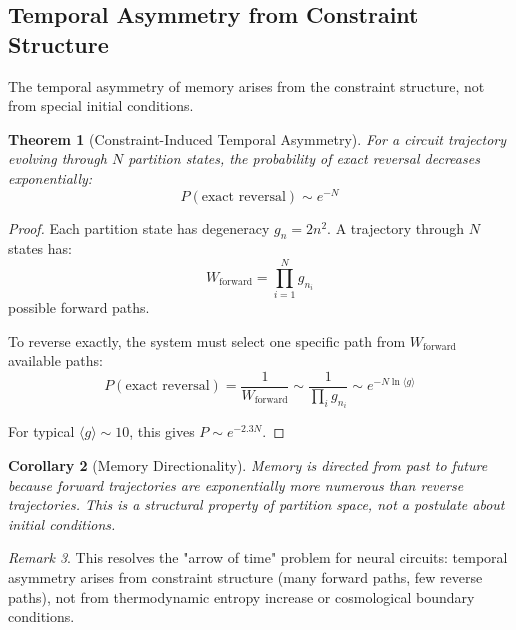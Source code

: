 \documentclass[aps,prd,twocolumn,superscriptaddress,floatfix,nofootinbib]{revtex4-2}
\newtheorem{theorem}{Theorem}[section]
\newtheorem{corollary}[theorem]{Corollary}
\theoremstyle{remark}
\newtheorem{remark}[theorem]{Remark}
\begin{document}
\subsection{Temporal Asymmetry from Constraint Structure}

The temporal asymmetry of memory arises from the constraint structure, not from special initial conditions.

\begin{theorem}[Constraint-Induced Temporal Asymmetry]
\label{thm:temporal_asymmetry}
For a circuit trajectory evolving through $N$ partition states, the probability of exact reversal decreases exponentially:
\begin{equation}
P(\text{exact reversal}) \sim e^{-N}
\end{equation}
\end{theorem}

\begin{proof}
Each partition state has degeneracy $g_n = 2n^2$. A trajectory through $N$ states has:
$$
W_{\text{forward}} = \prod_{i=1}^N g_{n_i}
$$
possible forward paths.

To reverse exactly, the system must select one specific path from $W_{\text{forward}}$ available paths:
$$
P(\text{exact reversal}) = \frac{1}{W_{\text{forward}}} \sim \frac{1}{\prod_i g_{n_i}} \sim e^{-N \ln\langle g \rangle}
$$

For typical $\langle g \rangle \sim 10$, this gives $P \sim e^{-2.3N}$.
\end{proof}

\begin{corollary}[Memory Directionality]
\label{cor:memory_temporal}
Memory is directed from past to future because forward trajectories are exponentially more numerous than reverse trajectories. This is a structural property of partition space, not a postulate about initial conditions.
\end{corollary}

\begin{remark}
This resolves the "arrow of time" problem for neural circuits: temporal asymmetry arises from constraint structure (many forward paths, few reverse paths), not from thermodynamic entropy increase or cosmological boundary conditions.
\end{remark}
\end{document}
